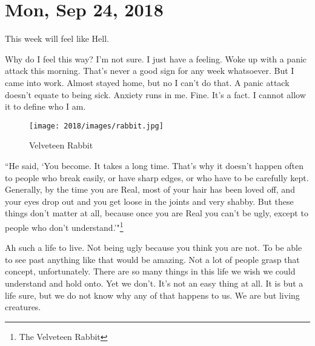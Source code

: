 \section{Mon, Sep 24, 2018}

This week will feel like Hell.

Why do I feel this way? I'm not sure. I just have a feeling. Woke up with a panic
attack this morning. That's never a good sign for any week whatsoever. But I came
into work. Almost stayed home, but no I can't do that. A panic attack doesn't equate
to being sick. Anxiety runs in me. Fine. It's a fact. I cannot allow it to define who
I am.

\begin{figure}[h!]
  \centering
  \texttt{[image: 2018/images/rabbit.jpg]}
  \caption{Velveteen Rabbit}
  \label{fig:rabbit}
\end{figure}

``He said, `You become. It takes a long time. That's why it doesn't happen often to
people who break easily, or have sharp edges, or who have to be carefully kept.
Generally, by the time you are Real, most of your hair has been loved off, and your
eyes drop out and you get loose in the joints and very shabby. But these things don't
matter at all, because once you are Real you can't be ugly, except to people who
don't understand.'"\footnote{The Velveteen Rabbit}

Ah such a life to live. Not being ugly because you think you are not. To be able to
see past anything like that would be amazing. Not a lot of people grasp that concept,
unfortunately. There are so many things in this life we wish we could understand and
hold onto. Yet we don't. It's not an easy thing at all. It is but a life sure, but we
do not know why any of that happens to us. We are but living creatures.